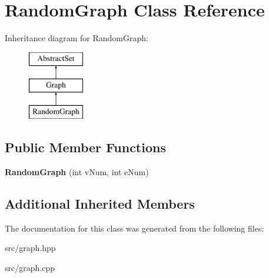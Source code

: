 \hypertarget{classRandomGraph}{\section{Random\-Graph Class Reference}
\label{classRandomGraph}
}
Inheritance diagram for Random\-Graph\-:\begin{figure}[H]
\begin{center}
\leavevmode
\includegraphics[height=3.000000cm]{classRandomGraph}
\end{center}
\end{figure}
\subsection*{Public Member Functions}
\begin{DoxyCompactItemize}
\item 
\hypertarget{classRandomGraph_aff05f804f75600257bf90455729b330f}{{\bfseries Random\-Graph} (int v\-Num, int e\-Num)}\label{classRandomGraph_aff05f804f75600257bf90455729b330f}

\end{DoxyCompactItemize}
\subsection*{Additional Inherited Members}


The documentation for this class was generated from the following files\-:\begin{DoxyCompactItemize}
\item 
src/graph.\-hpp\item 
src/graph.\-cpp\end{DoxyCompactItemize}
